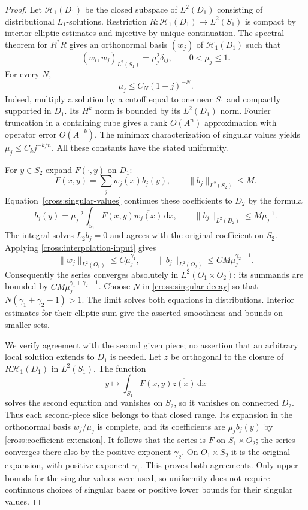 \documentclass[11pt]{article}
\theoremstyle{definition}
\theoremstyle{remark}
\newcommand{\dd}{\mathrm d}
\numberwithin{equation}{section}
\begin{document}
\begin{proof}
Let $\mathcal H_1(D_1)$ be the closed subspace of $L^2(D_1)$ consisting
of distributional $L_1$-solutions.  Restriction
$R:\mathcal H_1(D_1)\to L^2(S_1)$ is compact by interior elliptic
estimates and injective by unique continuation.  The spectral theorem
for $R^*R$ gives an orthonormal basis $(w_j)$ of
$\mathcal H_1(D_1)$ such that
\begin{equation}\label{cross:singular-values}
 (w_i,w_j)_{L^2(S_1)}=\mu_j^2\delta_{ij},
 \qquad 0<\mu_j\le1.
\end{equation}
For every $N$,
\begin{equation}\label{cross:singular-decay}
 \mu_j\le C_N(1+j)^{-N}.
\end{equation}
Indeed, multiply a solution by a cutoff equal to one near
$\overline{S_1}$ and compactly supported in $D_1$.  Its $H^k$ norm is
bounded by its $L^2(D_1)$ norm.  Fourier truncation in a containing cube
gives a rank $O(A^n)$ approximation with operator error $O(A^{-k})$.
The minimax characterization of singular values yields
$\mu_j\le C_kj^{-k/n}$.  All these constants have the stated uniformity.

For $y\in S_2$ expand $F(\cdot,y)$ on $D_1$:
\[
 F(x,y)=\sum_j w_j(x)b_j(y),\qquad
 \|b_j\|_{L^2(S_2)}\le M.
\]
Equation~\eqref{cross:singular-values} continues these coefficients to
$D_2$ by the formula
\begin{equation}\label{cross:coefficient-extension}
 b_j(y)=\mu_j^{-2}\int_{S_1}F(x,y)\overline{w_j(x)}\,\dd x,
 \qquad \|b_j\|_{L^2(D_2)}\le M\mu_j^{-1}.
\end{equation}
The integral solves $L_2b_j=0$ and agrees with the original coefficient
on $S_2$.  Applying \eqref{cross:interpolation-input} gives
\[
 \|w_j\|_{L^2(O_1)}\le C\mu_j^{\gamma_1},\qquad
 \|b_j\|_{L^2(O_2)}\le CM\mu_j^{\gamma_2-1}.
\]
Consequently the series converges absolutely in $L^2(O_1\times O_2)$:
its summands are bounded by $CM\mu_j^{\gamma_1+\gamma_2-1}$.
Choose $N$ in \eqref{cross:singular-decay} so that
$N(\gamma_1+\gamma_2-1)>1$.  The limit solves both equations
in distributions.  Interior estimates for their elliptic sum give
the asserted smoothness and bounds on smaller sets.

We verify agreement with the second given piece; no assertion that
an arbitrary local solution extends to $D_1$ is needed.  Let $z$ be
orthogonal to the closure of $R\mathcal H_1(D_1)$ in $L^2(S_1)$.
The function
\[
 y\longmapsto\int_{S_1}F(x,y)\overline{z(x)}\,\dd x
\]
solves the second equation and vanishes on $S_2$, so it vanishes on
connected $D_2$.  Thus each second-piece slice belongs to that closed
range.  Its expansion in the orthonormal basis $w_j/\mu_j$ is complete,
and its coefficients are $\mu_jb_j(y)$ by
\eqref{cross:coefficient-extension}.  It follows that the series is
$F$ on $S_1\times O_2$; the series converges there also by the positive
exponent $\gamma_2$.  On $O_1\times S_2$ it is the original expansion,
with positive exponent $\gamma_1$.  This proves both agreements.
Only upper bounds for the singular values were used, so uniformity
does not require continuous choices of singular bases or positive
lower bounds for their singular values.
\end{proof}
\end{document}
